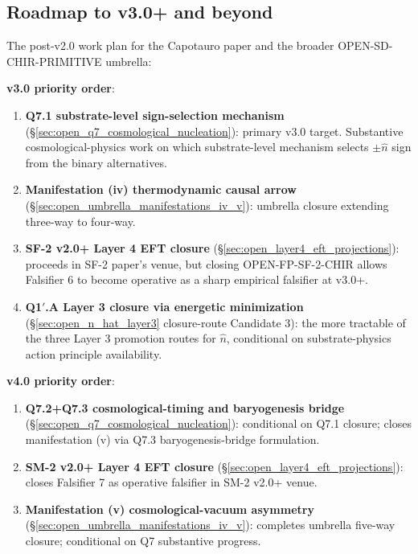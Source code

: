 \documentclass[11pt,letterpaper]{article}
\begin{document}
\subsection{Roadmap to v3.0+ and beyond}\label{sec:open_roadmap_v3}

The post-v2.0 work plan for the Capotauro paper and the broader OPEN-SD-CHIR-PRIMITIVE umbrella:

\textbf{v3.0 priority order}:

\begin{enumerate}\setlength\itemsep{0.3em}
    \item \textbf{Q7.1 substrate-level sign-selection mechanism} (\S\ref{sec:open_q7_cosmological_nucleation}): primary v3.0 target. Substantive cosmological-physics work on which substrate-level mechanism selects $\pm\hat{n}$ sign from the binary alternatives.
    \item \textbf{Manifestation (iv) thermodynamic causal arrow} (\S\ref{sec:open_umbrella_manifestations_iv_v}): umbrella closure extending three-way to four-way.
    \item \textbf{SF-2 v2.0+ Layer 4 EFT closure} (\S\ref{sec:open_layer4_eft_projections}): proceeds in SF-2 paper's venue, but closing OPEN-FP-SF-2-CHIR allows Falsifier 6 to become operative as a sharp empirical falsifier at v3.0+.
    \item \textbf{Q1$'$.A Layer 3 closure via energetic minimization} (\S\ref{sec:open_n_hat_layer3} closure-route Candidate 3): the more tractable of the three Layer 3 promotion routes for $\hat{n}$, conditional on substrate-physics action principle availability.
\end{enumerate}

\textbf{v4.0 priority order}:

\begin{enumerate}\setlength\itemsep{0.3em}
    \item \textbf{Q7.2+Q7.3 cosmological-timing and baryogenesis bridge} (\S\ref{sec:open_q7_cosmological_nucleation}): conditional on Q7.1 closure; closes manifestation (v) via Q7.3 baryogenesis-bridge formulation.
    \item \textbf{SM-2 v2.0+ Layer 4 EFT closure} (\S\ref{sec:open_layer4_eft_projections}): closes Falsifier 7 as operative falsifier in SM-2 v2.0+ venue.
    \item \textbf{Manifestation (v) cosmological-vacuum asymmetry} (\S\ref{sec:open_umbrella_manifestations_iv_v}): completes umbrella five-way closure; conditional on Q7 substantive progress.
\end{enumerate}
\end{document}
